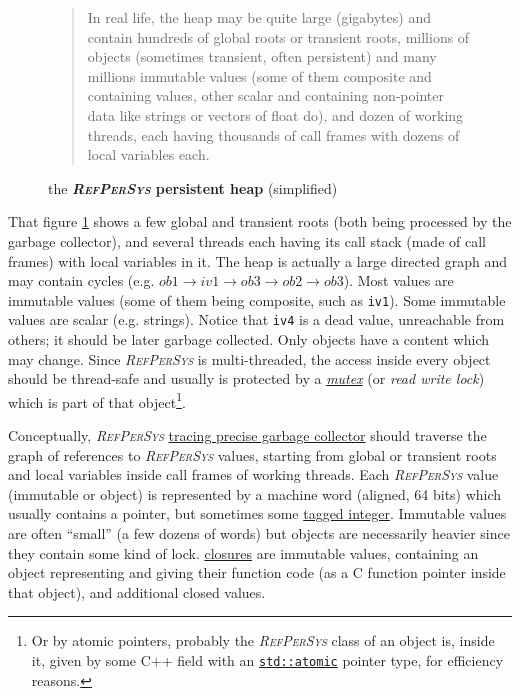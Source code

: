 \documentclass[11pt,a4paper,svgnames]{article}
\newcommand{\RefPerSys}{{\textit{\textsc{RefPerSys}}}}
\begin{document}
\begin{figure}[H]
\begin{quote}
\begin{relsize}{-0.2}
    In real life, the heap may be quite large (gigabytes) and contain
    hundreds of global roots or transient roots, millions of objects
    (sometimes transient, often persistent) and many millions
    immutable values (some of them composite and containing values,
    other scalar and containing non-pointer data like strings or
    vectors of float do), and dozen of working threads, each having
    thousands of call frames with dozens of local variables each.
   \end{relsize}
\end{quote}
  
  \caption{the  \textbf{{\RefPerSys} persistent heap}  (simplified)}
  \label{fig:persistent-heap}
\end{figure}

That figure \ref{fig:persistent-heap} shows a few global and transient
roots (both being processed by the garbage collector), and several
threads each having its call stack (made of call frames) with local
variables in it. The heap is actually a large directed graph and may
contain cycles (e.g. $ ob1 \rightarrow iv1 \rightarrow ob3 \rightarrow
ob2 \rightarrow ob3 $). Most values are immutable values (some of them
being composite, such as \texttt{iv1}). Some immutable values are
scalar (e.g. strings). Notice that \texttt{iv4} is a dead value,
unreachable from others; it should be later garbage collected.  Only
objects have a content which may change. Since {\RefPerSys} is
multi-threaded, the access inside every object should be thread-safe
and usually is protected by a \href{https://en.wikipedia.org/wiki/Lock\_(computer\_science)}{\textit{mutex}} (or \textit{read write
  lock}) which is part of that object\footnote{Or by atomic pointers,
probably the {\RefPerSys} class of an object is, inside it, given by
some C++ field with an
\href{https://en.cppreference.com/w/cpp/atomic/atomic}{\texttt{std::atomic}}
pointer type, for efficiency reasons.}.


Conceptually, {\RefPerSys}
\href{https://en.wikipedia.org/wiki/Tracing_garbage_collection}{tracing
  precise garbage collector} should traverse the graph of references
to {\RefPerSys} values, starting from global or transient roots and
local variables inside call frames of working threads. Each
{\RefPerSys} value (immutable or object) is represented by a machine
word (aligned, 64 bits) which usually contains a pointer, but
sometimes some
\href{https://en.wikipedia.org/wiki/Tagged\_pointer}{tagged integer}.
Immutable values are often ``small'' (a few dozens of words) but
objects are necessarily heavier since they contain some kind of
lock. \href{https://en.wikipedia.org/wiki/Closure\_(computer_programming)}{closures}
are immutable values, containing an object representing and giving
their function code (as a C function pointer inside that object), and
additional closed values.
\end{document}
